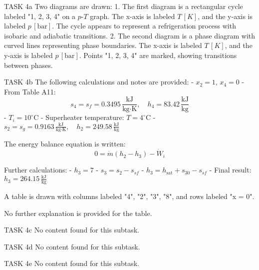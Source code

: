 TASK 4a  
Two diagrams are drawn:  
1. The first diagram is a rectangular cycle labeled "1, 2, 3, 4" on a \( p \)-\( T \) graph. The x-axis is labeled \( T \, [K] \), and the y-axis is labeled \( p \, [\text{bar}] \). The cycle appears to represent a refrigeration process with isobaric and adiabatic transitions.  
2. The second diagram is a phase diagram with curved lines representing phase boundaries. The x-axis is labeled \( T \, [K] \), and the y-axis is labeled \( p \, [\text{bar}] \). Points "1, 2, 3, 4" are marked, showing transitions between phases.  

TASK 4b  
The following calculations and notes are provided:  
- \( x_2 = 1 \), \( x_4 = 0 \)  
- From Table A11:  
  \[
  s_4 = s_f = 0.3495 \, \frac{\text{kJ}}{\text{kg·K}}, \quad h_4 = 83.42 \, \frac{\text{kJ}}{\text{kg}}
  \]  
- \( T_i = 10^\circ \text{C} \)  
- Superheater temperature: \( T = 4^\circ \text{C} \)  
- \( s_2 = s_g = 0.9163 \, \frac{\text{kJ}}{\text{kg·K}}, \quad h_2 = 249.58 \, \frac{\text{kJ}}{\text{kg}} \)  

The energy balance equation is written:  
\[
0 = \dot{m} \left( h_2 - h_3 \right) - \dot{W}_i
\]  

Further calculations:  
- \( h_3 = 7 \)  
- \( s_3 = s_2 - s_{sf} \)  
- \( h_3 = h_{\text{sat}} + s_{30} - s_{sf} \)  
- Final result: \( h_3 = 264.15 \, \frac{\text{kJ}}{\text{kg}} \)  

A table is drawn with columns labeled "4", "2", "3", "8", and rows labeled "x = 0".  

No further explanation is provided for the table.  

TASK 4c  
No content found for this subtask.  

TASK 4d  
No content found for this subtask.  

TASK 4e  
No content found for this subtask.  
